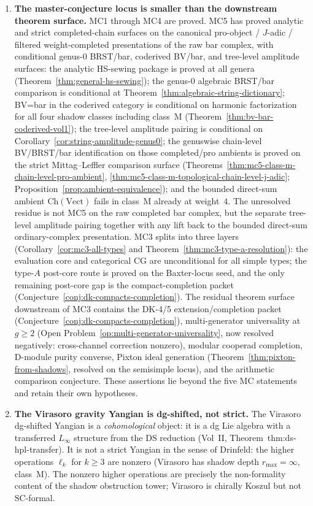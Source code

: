 \begin{enumerate}
\item \textbf{The master-conjecture locus is smaller than the
 downstream theorem surface.}
MC1 through MC4 are proved. MC5 has proved analytic and strict
completed-chain surfaces on the canonical pro-object / $J$-adic /
filtered weight-completed presentations of the raw bar complex, with
conditional genus-$0$ BRST/bar, coderived BV/bar, and tree-level
amplitude surfaces: the analytic HS-sewing package is proved
 at all genera (Theorem~\ref{thm:general-hs-sewing}); the
 genus-$0$ algebraic BRST/bar comparison is conditional at
 Theorem~\ref{thm:algebraic-string-dictionary}; BV=bar
 in the coderived category is conditional on harmonic factorization for
 all four shadow classes including class~M
 (Theorem~\ref{thm:bv-bar-coderived-vol1}); the tree-level
 amplitude pairing is conditional on
 Corollary~\ref{cor:string-amplitude-genus0}; the
 genuswise chain-level BV/BRST/bar identification on those completed/pro
 ambients is proved on the strict Mittag--Leffler comparison surface
 \textup{(}Theorems~\ref{thm:mc5-class-m-chain-level-pro-ambient},
 \ref{thm:mc5-class-m-topological-chain-level-j-adic};
 Proposition~\ref{prop:ambient-equivalence}\textup{)}; and the bounded
 direct-sum ambient $\mathrm{Ch}(\mathrm{Vect})$ fails in class~M
 already at weight~$4$. The unresolved residue is not MC5 on the raw
 completed bar complex, but the separate tree-level amplitude pairing
 together with any lift back to the bounded direct-sum ordinary-complex
 presentation.
MC3 splits into three layers
(Corollary~\ref{cor:mc3-all-types} and
Theorem~\ref{thm:mc3-type-a-resolution}):
the evaluation core and categorical CG are unconditional for all
simple types; the type-$A$ post-core route is proved on the
Baxter-locus seed, and the only remaining post-core gap is the
compact-completion packet
\textup{(}Conjecture~\ref{conj:dk-compacts-completion}\textup{)}.
 The residual theorem surface downstream of MC3 contains the
 DK-4/5 extension/completion packet
 (Conjecture~\ref{conj:dk-compacts-completion}),
 multi-generator universality at $g \geq 2$
 (Open Problem~\ref{op:multi-generator-universality}, now
 resolved negatively: cross-channel correction nonzero),
 modular cooperad completion,
 D-module purity converse,
 Pixton ideal generation
 (Theorem~\ref{thm:pixton-from-shadows},
 resolved on the semisimple locus),
 and the arithmetic comparison conjecture.
 These assertions lie beyond the five MC statements and retain their
 own hypotheses.

\item \textbf{The Virasoro gravity Yangian is dg-shifted, not strict.}
 The Virasoro dg-shifted Yangian is a
 \emph{cohomological} object: it is a dg Lie
 algebra with a transferred $L_\infty$ structure
 from the DS reduction
 (Vol~II, Theorem~\textup{thm:ds-hpl-transfer}).
 It is not a strict Yangian in the sense of
 Drinfeld: the higher operations
 $\ell_k$ for $k \geq 3$ are nonzero
 (Virasoro has shadow depth $r_{\max} = \infty$,
 class~M).
 The nonzero higher operations are precisely the non-formality content
 of the shadow obstruction tower; Virasoro is chirally Koszul but not
 $\mathrm{SC}$-formal.


\end{enumerate}
